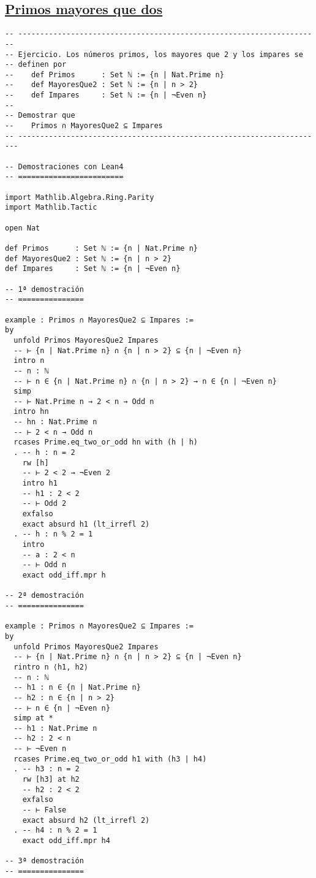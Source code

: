 \subsection{\href{./src/Conjuntos/Primos\_mayores\_que\_dos.lean}{Primos mayores que dos}}
\label{sec:orgb89814d}
\begin{verbatim}
-- ---------------------------------------------------------------------
-- Ejercicio. Los números primos, los mayores que 2 y los impares se
-- definen por
--    def Primos      : Set ℕ := {n | Nat.Prime n}
--    def MayoresQue2 : Set ℕ := {n | n > 2}
--    def Impares     : Set ℕ := {n | ¬Even n}
--
-- Demostrar que
--    Primos ∩ MayoresQue2 ⊆ Impares
-- ----------------------------------------------------------------------

-- Demostraciones con Lean4
-- ========================

import Mathlib.Algebra.Ring.Parity
import Mathlib.Tactic

open Nat

def Primos      : Set ℕ := {n | Nat.Prime n}
def MayoresQue2 : Set ℕ := {n | n > 2}
def Impares     : Set ℕ := {n | ¬Even n}

-- 1ª demostración
-- ===============

example : Primos ∩ MayoresQue2 ⊆ Impares :=
by
  unfold Primos MayoresQue2 Impares
  -- ⊢ {n | Nat.Prime n} ∩ {n | n > 2} ⊆ {n | ¬Even n}
  intro n
  -- n : ℕ
  -- ⊢ n ∈ {n | Nat.Prime n} ∩ {n | n > 2} → n ∈ {n | ¬Even n}
  simp
  -- ⊢ Nat.Prime n → 2 < n → Odd n
  intro hn
  -- hn : Nat.Prime n
  -- ⊢ 2 < n → Odd n
  rcases Prime.eq_two_or_odd hn with (h | h)
  . -- h : n = 2
    rw [h]
    -- ⊢ 2 < 2 → ¬Even 2
    intro h1
    -- h1 : 2 < 2
    -- ⊢ Odd 2
    exfalso
    exact absurd h1 (lt_irrefl 2)
  . -- h : n % 2 = 1
    intro
    -- a : 2 < n
    -- ⊢ Odd n
    exact odd_iff.mpr h

-- 2ª demostración
-- ===============

example : Primos ∩ MayoresQue2 ⊆ Impares :=
by
  unfold Primos MayoresQue2 Impares
  -- ⊢ {n | Nat.Prime n} ∩ {n | n > 2} ⊆ {n | ¬Even n}
  rintro n ⟨h1, h2⟩
  -- n : ℕ
  -- h1 : n ∈ {n | Nat.Prime n}
  -- h2 : n ∈ {n | n > 2}
  -- ⊢ n ∈ {n | ¬Even n}
  simp at *
  -- h1 : Nat.Prime n
  -- h2 : 2 < n
  -- ⊢ ¬Even n
  rcases Prime.eq_two_or_odd h1 with (h3 | h4)
  . -- h3 : n = 2
    rw [h3] at h2
    -- h2 : 2 < 2
    exfalso
    -- ⊢ False
    exact absurd h2 (lt_irrefl 2)
  . -- h4 : n % 2 = 1
    exact odd_iff.mpr h4

-- 3ª demostración
-- ===============


\end{verbatim}
